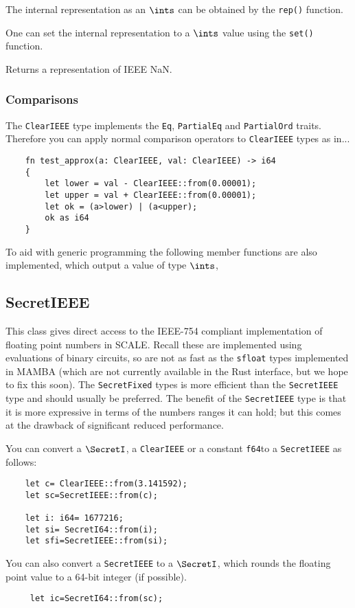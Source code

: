 The internal representation as an $\ints$ can be obtained by the
\verb|rep()| function.

One can set the internal representation to a $\ints$ value using
the \verb|set()| function.

Returns a representation of IEEE NaN.

\subsubsection{Comparisons}
The \verb|ClearIEEE| type implements the \verb|Eq|, \verb|PartialEq|
and \verb|PartialOrd| traits. Therefore you can apply normal
comparison operators to \verb|ClearIEEE| types as in...
\begin{lstlisting}
    fn test_approx(a: ClearIEEE, val: ClearIEEE) -> i64
    {
        let lower = val - ClearIEEE::from(0.00001);
        let upper = val + ClearIEEE::from(0.00001);
        let ok = (a>lower) | (a<upper);
        ok as i64
    }
\end{lstlisting}
To aid with generic programming the following member functions
are also implemented, which output a value of type $\ints$,


\subsection{SecretIEEE}
This class gives direct access to the IEEE-754 compliant implementation
of floating point numbers in SCALE. Recall these are implemented using
evaluations of binary circuits, so are not as fast as the \verb|sfloat|
types implemented in MAMBA (which are not currently available
in the Rust interface, but we hope to fix this soon).
The \verb|SecretFixed| types is more efficient than the \verb|SecretIEEE|
type and should usually be preferred. The benefit of the
\verb|SecretIEEE| type is that it is more expressive in terms
of the numbers ranges it can hold; but this comes at the drawback
of significant reduced performance.

You can convert a $\SecretI$, a \verb|ClearIEEE| or a constant
\verb|f64|to a \verb|SecretIEEE|
as follows:
\begin{lstlisting}
    let c= ClearIEEE::from(3.141592);
    let sc=SecretIEEE::from(c);

    let i: i64= 1677216;
    let si= SecretI64::from(i);
    let sfi=SecretIEEE::from(si);
\end{lstlisting}
You can also convert a  \verb|SecretIEEE| to a $\SecretI$, which rounds the
floating point value to a 64-bit integer (if possible).
\begin{lstlisting}
     let ic=SecretI64::from(sc);
\end{lstlisting}



